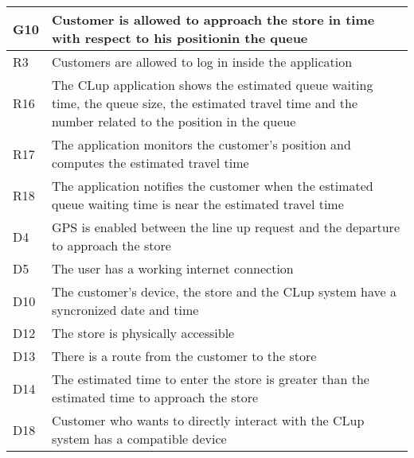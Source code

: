\begin{center}
        {\renewcommand{\arraystretch}{1.5}
        \begin{longtable}{L{2cm}L{12cm}}
            \hline
            \textbf{G10} & \textbf{Customer is allowed to approach the store in time with respect to his positionin the queue} \\
            \hline
             R3 & Customers are allowed to log in inside the application \\
            \hline
             R16 & The CLup application shows the estimated queue waiting time, the queue size, the estimated travel time and the number related to the position in the queue \\
            \hline
             R17 & The application monitors the customer’s position and computes the estimated travel time \\
            \hline
             R18 & The application notifies the customer when the estimated queue waiting time is near the estimated travel time \\
            \hline
             D4 & GPS is enabled between the line up request and the departure to approach the store \\
            \hline
             D5 & The user has a working internet connection \\
            \hline
             D10 & The customer’s device, the store and the CLup system have a syncronized date and time \\
            \hline
             D12 & The store is physically accessible \\
            \hline
             D13 & There is a route from the customer to the store \\
            \hline
             D14 & The estimated time to enter the store is greater than the estimated time to approach the store \\
            \hline
             D18 & Customer who wants to directly interact with the CLup system has a compatible device \\
            \hline
        \end{longtable}}
    \end{center}


